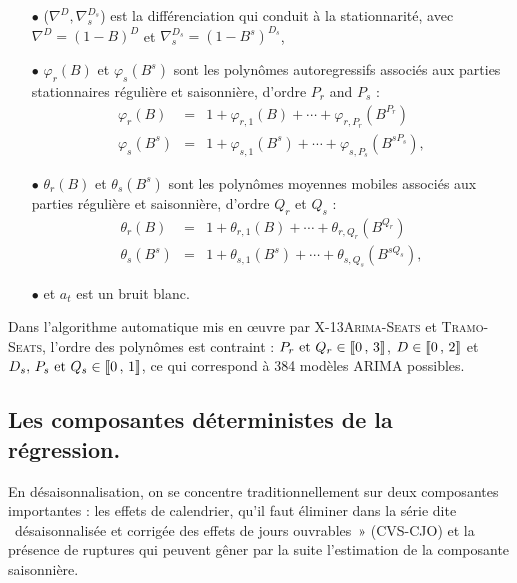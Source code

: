 \documentclass[12pt, a4paper, french]{article}
\begin{document}
\begin{itemize}
	\item[$\bullet$] ($\nabla^D, \nabla_s^{D_s}$) est la différenciation qui conduit à la stationnarité, avec $\nabla^D = (1-B)^D$ et $\nabla^{D_s}_s=(1-B^s)^{D_s}$,
	\item[$\bullet$] $\varphi_r (B)$  et $\varphi_s (B^s)$ sont les polynômes autoregressifs associés aux parties stationnaires régulière et saisonnière, d'ordre $P_r$ and $P_s$ : 
$$
\begin{array}{lcl}
\varphi_r (B)   & = & 1 + \varphi_{r,1} (B) + \cdots + \varphi_{r,P_r} (B^{P_r}) \\
\varphi_s (B^s) & = & 1 + \varphi_{s,1} (B^s) + \cdots + \varphi_{s,P_s} (B^{sP_s}),
\end{array}
$$
	\item[$\bullet$] $\theta_r (B)$  et $\theta_s (B^s)$ sont les polynômes moyennes mobiles associés aux parties régulière et saisonnière, d'ordre $Q_r$ et $Q_s$ : 
$$
\begin{array}{lcl}
\theta_r (B)   & = & 1 + \theta_{r,1} (B) + \cdots + \theta_{r,Q_r} (B^{Q_r}) \\
\theta_s (B^s) & = & 1 + \theta_{s,1} (B^s) + \cdots + \theta_{s,Q_s} (B^{sQ_s}),
\end{array}
$$
	\item[$\bullet$] et $a_t$ est un bruit blanc.
\end{itemize}

Dans l'algorithme automatique mis en œuvre par \textsc{X-13Arima-Seats} et \textsc{Tramo-Seats}, l'ordre des polynômes est contraint : $P_r\text{ et }Q_r\in \llbracket 0\,,\, 3 \rrbracket$, $D\in \llbracket 0\,,\, 2 \rrbracket$ et $D_s,\, P_s \text{ et } Q_s\in \llbracket 0\,,\, 1 \rrbracket$, ce qui correspond à 384 modèles ARIMA possibles. 


\subsection{Les composantes déterministes de la régression.}

En désaisonnalisation, on se concentre traditionnellement sur deux composantes importantes : les effets de calendrier, qu'il faut éliminer dans la série dite \og~désaisonnalisée et corrigée des effets de jours ouvrables~» (CVS-CJO) et la présence de ruptures qui peuvent gêner par la suite l'estimation de la composante saisonnière.
\end{document}
